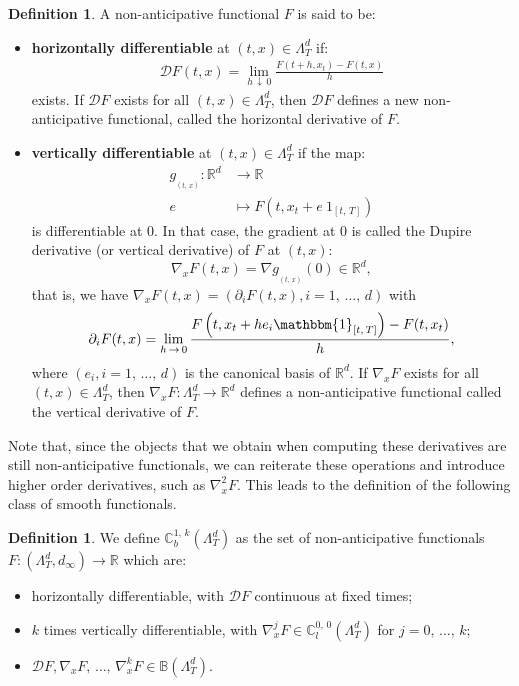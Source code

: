 \documentclass[10pt]{amsart}
\theoremstyle{definition}\newtheorem{defi}[theo]{Definition}\newtheorem{rema}[theo]{Remark}\newtheorem{exam}[theo]{Example}\newtheorem{exem}[theo]{Example}\newtheorem{nota}[theo]{Notation}
\newcommand{\bbC}{\mathbb{C}}
\newcommand{\bbB}{\mathbb{B}}
\newcommand{\bbmun}{\mathbbm{1}}
\newcommand{\calD}{\mathcal{D}}
\newcommand{\Rr}{{\mathbb{R}}}
\begin{document}
\begin{defi}
A non-anticipative functional $F$ is said to be:
\begin{itemize}
\item \textbf{horizontally differentiable} at $(t, {x}) \in \Lambda_T^d$ if:
\begin{align}
\calD F(t, {x}) = \lim_{h\,\downarrow\,0} \frac{F(t + h, {x}_t) - F(t, {x})}{h}
\end{align}
exists. If $\calD F$ exists for all $(t, {x}) \in \Lambda_T^d$, then $\calD F$ defines a new non-anticipative functional, called the horizontal derivative of $F$.
\item \textbf{vertically differentiable} at $(t, {x}) \in \Lambda_T^d$ if the map:
\begin{align*}
g_{_{(t,\,{x})}} : \Rr^d &\rightarrow \Rr\\
e &\mapsto F\left(t, {x}_t+e\ 1_{[t,\,T]}\right)
\end{align*}
is differentiable at $0$. In that case, the gradient at $0$ is called the Dupire derivative (or vertical derivative) of $F$ at $(t, {x})$:
\[
\nabla_{x} F(t, {x}) = \nabla g_{_{(t,\,{x})}}(0) \in \Rr^d,
\]
that is, we have $\nabla_{x} F(t, {x}) = (\partial_i F(t, {x}), i = 1,\,\dots,\,d)$ with
\[
\partial_i F(t, {x}) = \lim_{h\,\rightarrow\,0} \frac{F\left(t, {x}_t + he_i\bbmun_{[t,\,T]}\right) - F(t, {x}_t)}{h},
\]
where $(e_i, i=1,\,\dots,\,d)$ is the canonical basis of $\Rr^d$. If $\nabla_{x} F$ exists for all $(t, {x}) \in \Lambda_T^d$, then $\nabla_{x} F : \Lambda_T^d \rightarrow \Rr^d$ defines a non-anticipative functional called the vertical derivative of $F$.
\end{itemize}
\end{defi}

Note that, since the objects that we obtain when computing these derivatives are still non-anticipative functionals, we can reiterate these operations and introduce higher order derivatives, such as $\nabla_{x}^2 F$. This leads to the definition of the following class of smooth functionals.
\begin{defi}
We define $\bbC^{1,\,k}_b(\Lambda_T^d)$ as the set of non-anticipative functionals $F: (\Lambda_T^d, d_\infty) \rightarrow \Rr$ which are:
\begin{itemize}
\item horizontally differentiable, with $\calD F$ continuous at fixed times;
\item $k$ times vertically differentiable, with $\nabla_{x}^j F \in \bbC_l^{0,\,0}(\Lambda_T^d)$ for $j = 0,\,\ldots,\,k$;
\item $\calD F, \nabla_{x} F,\,\ldots,\,\nabla_{x}^k F \in \bbB(\Lambda_T^d)$.
\end{itemize}
\end{defi}
\end{document}
